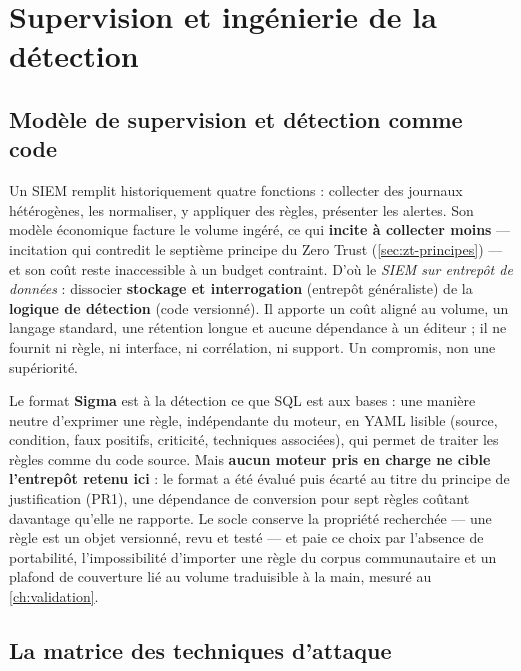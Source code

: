 \section{Supervision et ingénierie de la détection}
\label{sec:detection}

\subsection{Modèle de supervision et détection comme code}
\label{sec:supervision-modele}
\label{sec:detection-code}

Un SIEM remplit historiquement quatre fonctions : collecter des journaux hétérogènes, les
normaliser, y appliquer des règles, présenter les alertes. Son modèle économique facture le volume
ingéré, ce qui \textbf{incite à collecter moins} --- incitation qui contredit le septième principe
du Zero Trust (\cref{sec:zt-principes}) --- et son coût reste inaccessible à un budget
contraint. D'où le \emph{SIEM sur entrepôt de données} : dissocier \textbf{stockage et
interrogation} (entrepôt généraliste) de la \textbf{logique de détection} (code versionné). Il
apporte un coût aligné au volume, un langage standard, une rétention longue et aucune dépendance
à un éditeur ; il ne fournit ni règle, ni interface, ni corrélation, ni support. Un compromis,
non une supériorité.

Le format \textbf{Sigma} \cite{sigma_spec} est à la détection ce que SQL est aux bases : une
manière neutre d'exprimer une règle, indépendante du moteur, en YAML lisible (source, condition,
faux positifs, criticité, techniques associées), qui permet de traiter les règles comme du code
source. Mais \textbf{aucun moteur pris en charge ne cible l'entrepôt retenu ici} : le format a été
évalué puis écarté au titre du principe de justification (PR1), une dépendance de conversion pour
sept règles coûtant davantage qu'elle ne rapporte. Le socle conserve la propriété recherchée ---
une règle est un objet versionné, revu et testé --- et paie ce choix par l'absence de portabilité,
l'impossibilité d'importer une règle du corpus communautaire et un plafond de couverture lié au
volume traduisible à la main, mesuré au \cref{ch:validation}.

\subsection{La matrice des techniques d'attaque}
\label{sec:attck-matrice}

